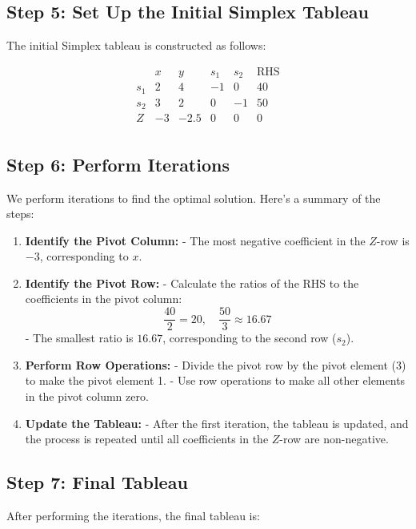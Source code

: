 \documentclass{article}
\begin{document}
\subsection*{Step 5: Set Up the Initial Simplex Tableau}
The initial Simplex tableau is constructed as follows:

\[
\begin{array}{cccccc|c}
 & x & y & s_1 & s_2 & \text{RHS} \\
\hline
s_1 & 2 & 4 & -1 & 0 & 40 \\
s_2 & 3 & 2 & 0 & -1 & 50 \\
\hline
Z & -3 & -2.5 & 0 & 0 & 0 \\
\end{array}
\]

\subsection*{Step 6: Perform Iterations}
We perform iterations to find the optimal solution. Here’s a summary of the steps:

\begin{enumerate}
    \item \textbf{Identify the Pivot Column:}
    - The most negative coefficient in the \( Z \)-row is \(-3\), corresponding to \( x \).
    
    \item \textbf{Identify the Pivot Row:}
    - Calculate the ratios of the RHS to the coefficients in the pivot column:
    \[
    \frac{40}{2} = 20, \quad \frac{50}{3} \approx 16.67
    \]
    - The smallest ratio is \( 16.67 \), corresponding to the second row (\( s_2 \)).
    
    \item \textbf{Perform Row Operations:}
    - Divide the pivot row by the pivot element (3) to make the pivot element 1.
    - Use row operations to make all other elements in the pivot column zero.
    
    \item \textbf{Update the Tableau:}
    - After the first iteration, the tableau is updated, and the process is repeated until all coefficients in the \( Z \)-row are non-negative.
\end{enumerate}

\subsection*{Step 7: Final Tableau}
After performing the iterations, the final tableau is:
\end{document}
